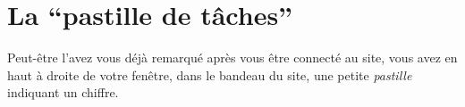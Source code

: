 % 
% 
% 
% 
% 
% 
% 
% 

\section{La “pastille de tâches”}\hypertarget{pastille-taches}{}\label{pastille-taches}

Peut-être l'avez vous déjà remarqué après vous être connecté au site, vous avez en haut à droite de votre fenêtre, dans le bandeau du site, une petite \emph{pastille} indiquant un chiffre.


